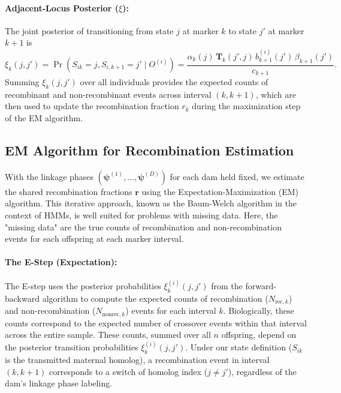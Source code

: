 \documentclass[11pt]{article}
\begin{document}
\paragraph{Adjacent-Locus Posterior (\texorpdfstring{$\xi$}{xi}):} The joint posterior of transitioning from state $j$ at marker $k$ to state $j'$ at marker $k+1$ is
\begin{equation}
    \xi_k(j,j') = \Pr(S_{ik}=j, S_{i,k+1}=j' \mid O^{(i)}) =
\frac{\alpha_k(j)\,\mathbf T_k(j',j)\,b_{k+1}^{(i)}(j')\,\beta_{k+1}(j')}{c_{k+1}}.
\end{equation}
Summing $\xi_k(j,j')$ over all individuals provides the expected counts of recombinant and non-recombinant events across interval $(k, k+1)$, which are then used to update the recombination fraction $r_k$ during the maximization step of the EM algorithm.

\subsection{EM Algorithm for Recombination Estimation}

With the linkage phases $(\boldsymbol{\psi}^{(1)}, \dots, \boldsymbol{\psi}^{(D)})$ for each dam held fixed, we estimate the shared recombination fractions $\mathbf{r}$ using the Expectation-Maximization (EM) algorithm. This iterative approach, known as the Baum-Welch algorithm in the context of HMMs, is well suited for problems with missing data. Here, the "missing data" are the true counts of recombination and non-recombination events for each offspring at each marker interval.

\paragraph{The E-Step (Expectation):}
The E-step uses the posterior probabilities $\xi_k^{(i)}(j,j')$ from the forward-backward algorithm to compute the expected counts of recombination ($N_{\text{rec},k}$) and non-recombination ($N_{\text{nonrec},k}$) events for each interval $k$. Biologically, these counts correspond to the expected number of crossover events within that interval across the entire sample. 
These counts, summed over all $n$ offspring, depend on the posterior transition probabilities
$\xi_k^{(i)}(j,j')$. Under our state definition ($S_{ik}$ is the transmitted maternal homolog),
a recombination event in interval $(k,k{+}1)$ corresponds to a switch of homolog index
($j\neq j'$), regardless of the dam's linkage phase labeling.
\end{document}
